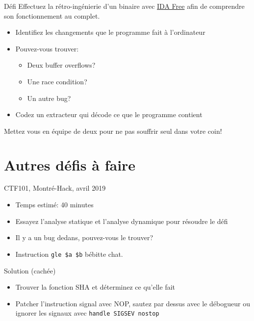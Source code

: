 \documentclass[10pt,xcolor={table,dvipsnames},t]{beamer}
\begin{document}
\begin{frame}{Défi}
    Effectuez la rétro-ingénierie d'un binaire avec \href{https://www.hex-rays.com/products/ida/support/download_freeware.shtml}{IDA Free} afin de comprendre son fonctionnement au complet.
    \begin{itemize}
        \item Identifiez les changements que le programme fait à l'ordinateur
        \item Pouvez-vous trouver: 
        \begin{itemize}
            \item Deux buffer overflows?
            \item Une race condition?
            \item Un autre bug?
        \end{itemize}
        \item Codez un extracteur qui décode ce que le programme contient
    \end{itemize}
    Mettez vous en équipe de deux pour ne pas souffrir seul dans votre coin!
\end{frame}


\normalframetitle

\iffalse

\section{Autres défis à faire}

\begin{frame}{CTF101, Montré-Hack, avril 2019}
    \begin{itemize}
        \item Temps estimé: 40 minutes
        \item Essayez l'analyse statique et l'analyse dynamique pour résoudre le défi
        \item Il y a un bug dedans, pouvez-vous le trouver?
        \item Instruction \texttt{gle \$a \$b} bébitte chat.
    \end{itemize}
    
    \begin{block}{Solution (cachée)}
        \begin{itemize}
            \item Trouver la fonction SHA et déterminez ce qu'elle fait
            \item Patcher l'instruction signal avec NOP, sautez par dessus avec le débogueur ou ignorer les signaux avec \texttt{handle SIGSEV nostop}
        \end{itemize}
    \end{block}
\end{frame}
\end{document}
